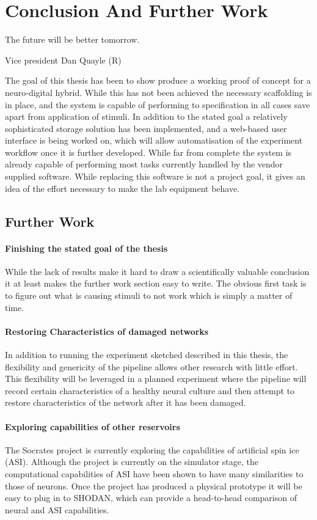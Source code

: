 \chapter{Conclusion And Further Work}
\epigraph{The future will be better tomorrow.}
{Vice president Dan Quayle (R)}
The goal of this thesis has been to show produce a working proof of concept for
a neuro-digital hybrid.
While this has not been achieved the necessary scaffolding is in place, and the
system is capable of performing to specification in all cases save apart from
application of stimuli.
In addition to the stated goal a relatively sophisticated storage solution has
been implemented, and a web-based user interface is being worked on, which will
allow automatisation of the experiment workflow once it is further developed.
While far from complete the system is already capable of performing most tasks
currently handled by the vendor supplied software.
While replacing this software is not a project goal, it gives an idea of the
effort necessary to make the lab equipment behave.
\section{Further Work}
\subsubsection{Finishing the stated goal of the thesis}
While the lack of results make it hard to draw a scientifically valuable
conclusion it at least makes the further work section easy to write.
The obvious first task is to figure out what is causing stimuli to not work
which is simply a matter of time.
\subsubsection{Restoring Characteristics of damaged networks}
In addition to running the experiment sketched described in this thesis, the
flexibility and genericity of the pipeline allows other research with little
effort.
This flexibility will be leveraged in a planned experiment where the pipeline
will record certain characteristics of a healthy neural culture and then attempt
to restore characteristics of the network after it has been damaged.
\subsubsection{Exploring capabilities of other reservoirs}
The Socrates project is currently exploring the capabilities of artificial spin
ice (ASI).
Although the project is currently on the simulator stage, the computational
capabilities of ASI have been shown to have many similarities to those of
neurons.
Once the project has produced a physical prototype it will be easy to plug in to
SHODAN, which can provide a head-to-head comparison of neural and ASI
capabilities.
